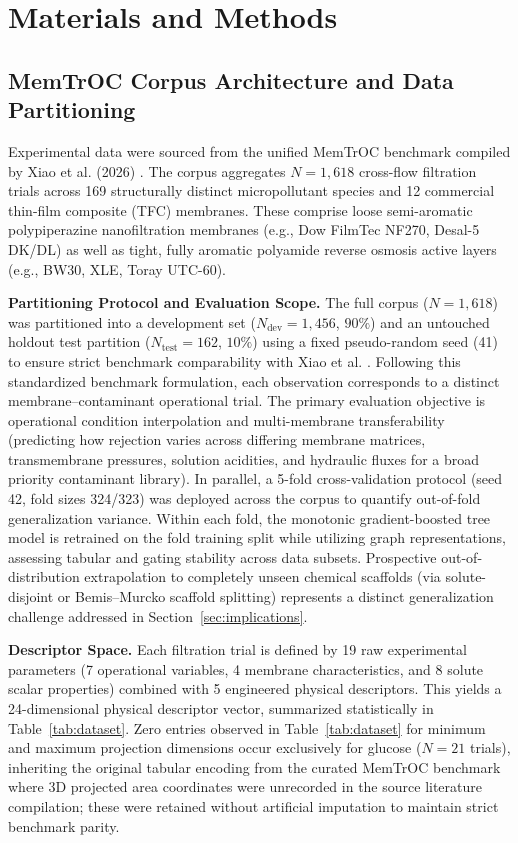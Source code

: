 \documentclass[10pt,twocolumn]{article}
\begin{document}
\section{Materials and Methods}
\label{sec:methods}

\subsection{MemTrOC Corpus Architecture and Data Partitioning}
\label{subsec:dataset}

Experimental data were sourced from the unified MemTrOC benchmark compiled by Xiao et al. (2026) \cite{xiao2026}. The corpus aggregates $N = 1{,}618$ cross-flow filtration trials across 169 structurally distinct micropollutant species and 12 commercial thin-film composite (TFC) membranes. These comprise loose semi-aromatic polypiperazine nanofiltration membranes (e.g., Dow FilmTec NF270, Desal-5 DK/DL) as well as tight, fully aromatic polyamide reverse osmosis active layers (e.g., BW30, XLE, Toray UTC-60).

\textbf{Partitioning Protocol and Evaluation Scope.} The full corpus ($N = 1{,}618$) was partitioned into a development set ($N_{\mathrm{dev}} = 1{,}456$, $90\%$) and an untouched holdout test partition ($N_{\mathrm{test}} = 162$, $10\%$) using a fixed pseudo-random seed (41) to ensure strict benchmark comparability with Xiao et al. \cite{xiao2026}. Following this standardized benchmark formulation, each observation corresponds to a distinct membrane--contaminant operational trial. The primary evaluation objective is operational condition interpolation and multi-membrane transferability (predicting how rejection varies across differing membrane matrices, transmembrane pressures, solution acidities, and hydraulic fluxes for a broad priority contaminant library). In parallel, a 5-fold cross-validation protocol (seed 42, fold sizes 324/323) was deployed across the corpus to quantify out-of-fold generalization variance. Within each fold, the monotonic gradient-boosted tree model is retrained on the fold training split while utilizing graph representations, assessing tabular and gating stability across data subsets. Prospective out-of-distribution extrapolation to completely unseen chemical scaffolds (via solute-disjoint or Bemis--Murcko scaffold splitting) represents a distinct generalization challenge addressed in Section~\ref{sec:implications}.

\textbf{Descriptor Space.} Each filtration trial is defined by 19 raw experimental parameters (7 operational variables, 4 membrane characteristics, and 8 solute scalar properties) combined with 5 engineered physical descriptors. This yields a 24-dimensional physical descriptor vector, summarized statistically in Table~\ref{tab:dataset}. Zero entries observed in Table~\ref{tab:dataset} for minimum and maximum projection dimensions occur exclusively for glucose ($N = 21$ trials), inheriting the original tabular encoding from the curated MemTrOC benchmark \cite{xiao2026} where 3D projected area coordinates were unrecorded in the source literature compilation; these were retained without artificial imputation to maintain strict benchmark parity.
\end{document}

